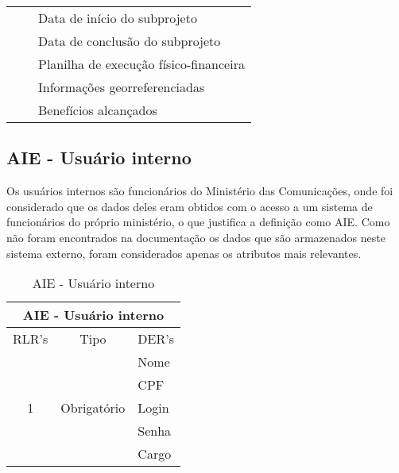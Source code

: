 \begin{table}[!h]
\begin{tabular}{|c|c|l|}
				  &                              & Data de início do subprojeto                  \\ \cline{3-3} 
				  &                              & Data de conclusão do subprojeto                 \\ \cline{3-3}
				  &				 & Planilha de execução físico-financeira \\ \cline{3-3} 
				  &  				 & Informações georreferenciadas \\ \cline{3-3}         
				  &                              & Benefícios alcançados    \\ \hline
      \end{tabular}
      \end{table}

  \subsection{AIE - Usuário interno}
      
      Os usuários internos são funcionários do Ministério das Comunicações, onde foi considerado que os dados deles
      eram obtidos com o acesso a um sistema de funcionários do próprio ministério, o que justifica a definição como AIE.
      Como não foram encontrados na documentação os dados que são armazenados neste sistema externo,
      foram considerados apenas os atributos mais relevantes.
      
      \begin{table}[!h]
      \centering
      \caption{AIE - Usuário interno}
      \label{aie_usuario_interno}
      \begin{tabular}{|c|c|l|}
      \hline
      \multicolumn{3}{|c|}{AIE - Usuário interno}                                             \\ \hline
      \multicolumn{1}{|l|}{RLR's} & Tipo                         & \multicolumn{1}{c|}{DER's} \\ \hline
      \multirow{5}{*}{1}          & \multirow{5}{*}{Obrigatório} & Nome                       \\ \cline{3-3} 
				  &                              & CPF                        \\ \cline{3-3} 
				  &                              & Login                      \\ \cline{3-3} 
				  &                              & Senha                      \\ \cline{3-3}
                                  &		                 & Cargo                      \\ \hline
      \end{tabular}
      \end{table}
      
